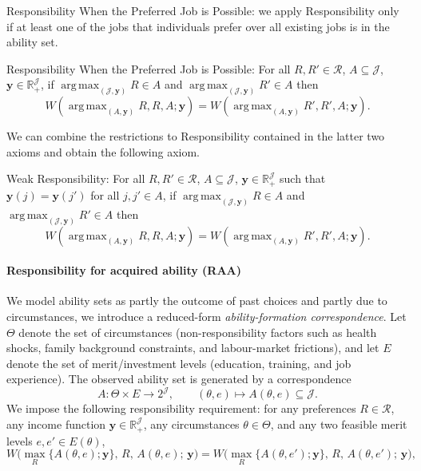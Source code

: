 \documentclass[12pt]{article}
\DeclareMathOperator*{\argmax}{arg\,max}
\begin{document}
Responsibility When the Preferred Job is Possible: we apply Responsibility only if at least one of the jobs that individuals prefer over all existing jobs is in the ability set. 

Responsibility When the Preferred Job is Possible: For all $R,R'\in \mathcal{R}$, $A\subseteq \mathcal{J}$, $\mathbf{y} \in \mathbb{R}_{+}^{\mathcal{J}}$, if $\argmax_{(\mathcal{J},\mathbf{y})}R\in A$ and $\argmax_{(\mathcal{J},\mathbf{y})}R'\in A$ then
\begin{equation*}
\label{ }
W(\argmax_{(A,\mathbf{y})}R,R,A;\mathbf{y})=W(\argmax_{(A,\mathbf{y})}R',R',A;\mathbf{y}).
\end{equation*}


We can combine the restrictions to Responsibility contained in the latter two axioms and obtain the following axiom.

Weak Responsibility: For all $R,R'\in \mathcal{R}$, $A\subseteq \mathcal{J}$, $\mathbf{y} \in \mathbb{R}_{+}^{\mathcal{J}}$ such that $\mathbf{y}(j)=\mathbf{y}(j')$ for all $j,j'\in A$, if $\argmax_{(\mathcal{J},\mathbf{y})}R\in A$ and $\argmax_{(\mathcal{J},\mathbf{y})}R'\in A$ then
\begin{equation*}
\label{ }
W(\argmax_{(A,\mathbf{y})}R,R,A;\mathbf{y})=W(\argmax_{(A,\mathbf{y})}R',R',A;\mathbf{y}).
\end{equation*}

\paragraph{\textbf{Responsibility for acquired ability (RAA)}}
We model ability sets as partly the outcome of past choices and partly due to circumstances, we introduce a reduced-form \emph{ability-formation correspondence}. Let $\Theta$ denote the set of circumstances (non-responsibility factors such as health shocks, family background constraints, and labour-market frictions), and let $E$ denote the set of merit/investment levels (education, training, and job experience). The observed ability set is generated by a correspondence
\begin{equation}
\label{ }
A:\Theta\times E \to 2^{\mathcal J},\qquad (\theta,e)\mapsto A(\theta,e)\subseteq \mathcal J.
\end{equation}
We impose the following responsibility requirement: for any preferences $R\in\mathcal R$, any income function $\mathbf y\in\mathbb R_+^{\mathcal J}$, any circumstances $\theta\in\Theta$, and any two feasible merit levels $e,e'\in E(\theta)$,
\begin{equation}
    \label{}
    W\!\big(\max_{R}\{A(\theta,e);\mathbf y\},\,R,\,A(\theta,e);\,\mathbf y\big)
=
W\!\big(\max_{R}\{A(\theta,e');\mathbf y\},\,R,\,A(\theta,e');\,\mathbf y\big),
\end{equation}
\end{document}
